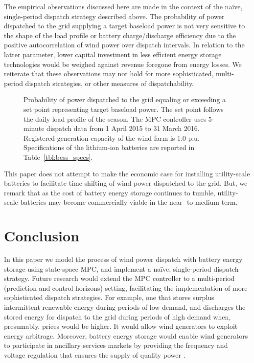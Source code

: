\documentclass[3p,times,procedia]{elsarticle}
\begin{document}
The empirical observations discussed here are made in the context of the na\"ive, single-period dispatch strategy described above.  The probability of power dispatched to the grid supplying a target baseload power is not very sensitive to the shape of the load profile or battery charge/discharge efficiency due to the positive autocorrelation of wind power over dispatch intervals.  In relation to the latter parameter, lower capital investment in less efficient energy storage technologies would be weighed against revenue foregone from energy losses.  We reiterate that these observations may not hold for more sophisticated, multi-period dispatch strategies, or other measures of dispatchability.

\begin{figure*}[!t]
	\centering
	\scalebox{0.88}{
		
	}
	\caption[Dispatchability of wind power with battery energy storage]{Probability of power dispatched to the grid equaling or exceeding a set point representing target baseload power.  The set point follows the daily load profile of the season. The MPC controller uses 5-minute dispatch data from 1 April 2015 to 31 March 2016.  Registered generation capacity of the wind farm is 1.0 p.u.  Specifications of the lithium-ion batteries are reported in Table~\ref{tbl:bess_specs}.} 
	\label{fig:disp_wind_bess}
\end{figure*}

This paper does not attempt to make the economic case for installing utility-scale batteries to facilitate time shifting of wind power dispatched to the grid.  But, we remark that as the cost of battery energy storage continues to tumble, utility-scale batteries may become commercially viable in the near- to medium-term.

\section{Conclusion}\label{sect:conclusion}
In this paper we model the process of wind power dispatch with battery energy storage using state-space MPC, and implement a na\"ive, single-period dispatch strategy.  Future research would extend the MPC controller to a multi-period (prediction and control horizons) setting, facilitating the implementation of more sophisticated dispatch strategies.  For example, one that stores surplus intermittent renewable energy during periods of low demand, and discharges the stored energy for dispatch to the grid during periods of high demand when, presumably, prices would be higher.  It would allow wind generators to exploit energy arbitrage.  Moreover, battery energy storage would enable wind generators to participate in ancillary services markets by providing the frequency and voltage regulation that ensures the supply of quality power \cite{ABLFJD12}.
\end{document}
